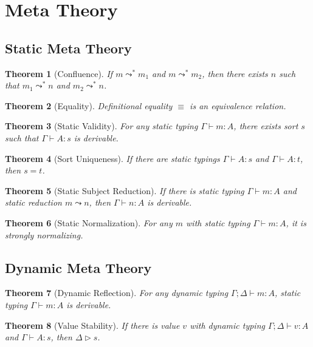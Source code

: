 \documentclass{article}
\newtheorem{theorem}{Theorem}
\begin{document}
\newpage

\section{Meta Theory}

\subsection*{Static Meta Theory}
\begin{theorem}[Confluence]
  If $m \leadsto^{*} m_{1}$ and $m \leadsto^{*} m_{2}$, then there exists $n$ such that $m_{1} \leadsto^{*} n$ and $m_{2} \leadsto^{*} n$.
\end{theorem}

\begin{theorem}[Equality]
  Definitional equality $\equiv$ is an equivalence relation.
\end{theorem}

\begin{theorem}[Static Validity]
  For any static typing $\Gamma \vdash m : A$, there exists sort $s$ such that $\Gamma \vdash A : s$ is derivable.
\end{theorem}

\begin{theorem}[Sort Uniqueness]
  If there are static typings $\Gamma \vdash A : s$ and $\Gamma \vdash A : t$, then $s = t$.
\end{theorem}

\begin{theorem}[Static Subject Reduction]
  If there is static typing $\Gamma \vdash m : A$ and static reduction $m \leadsto n$, then $\Gamma \vdash n : A$ is derivable.
\end{theorem}

\begin{theorem}[Static Normalization]
  For any $m$ with static typing $\Gamma \vdash m : A$, it is strongly normalizing.
\end{theorem}

\subsection*{Dynamic Meta Theory}
\begin{theorem}[Dynamic Reflection]
  For any dynamic typing $\Gamma ; \Delta \vdash m : A$, static typing $\Gamma \vdash m : A$ is derivable.
\end{theorem}

\begin{theorem}[Value Stability]
  If there is value $v$ with dynamic typing $\Gamma ; \Delta \vdash v : A$ and $\Gamma \vdash A : s$, then $\Delta \triangleright s$.
\end{theorem}
\end{document}
